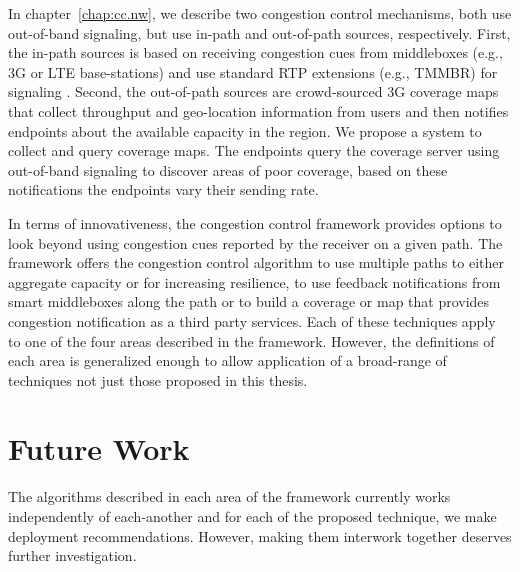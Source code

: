 In chapter~\ref{chap:cc.nw}, we describe two congestion control mechanisms,
both use out-of-band signaling, but use in-path and out-of-path sources,
respectively. First, the in-path sources is based on receiving congestion cues
from middleboxes (e.g., 3G or LTE base-stations) and use standard RTP
extensions (e.g., TMMBR) for signaling . Second, the out-of-path sources are
crowd-sourced 3G coverage maps that collect throughput and geo-location
information from users and then notifies endpoints about the available
capacity in the region. We propose a system to collect and query coverage
maps. The endpoints query the coverage server using out-of-band signaling to
discover areas of poor coverage, based on these notifications the endpoints
vary their sending rate.

In terms of innovativeness, the congestion control framework provides options
to look beyond using congestion cues reported by the receiver on a given path.
The framework offers the congestion control algorithm to use multiple paths to
either aggregate capacity or for increasing resilience, to use feedback
notifications from smart middleboxes along the path or to build a coverage or
map that provides congestion notification as a third party services. Each of
these techniques apply to one of the four areas described in the framework.
However, the definitions of each area is generalized enough to allow
application of a broad-range of techniques not just those proposed in this
thesis.


\section{Future Work}

The algorithms described in each area of the framework currently works
independently of each-another and for each of the proposed technique, we make
deployment recommendations. However, making them interwork together deserves
further investigation.